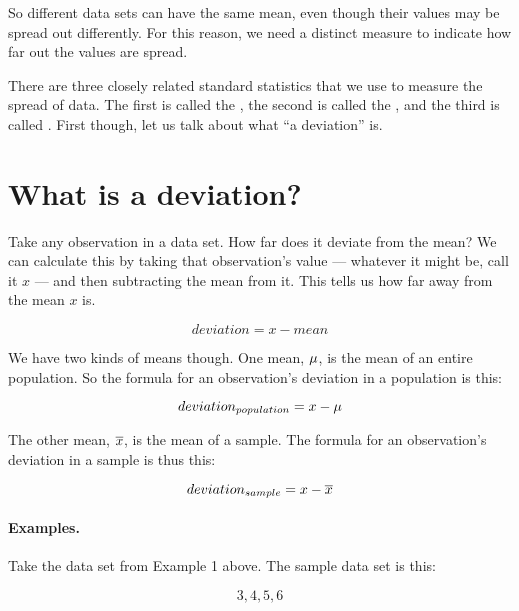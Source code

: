 \documentclass[../../../main.tex]{subfiles}
\begin{document}
So different data sets can have the same mean, even though their values may be spread out differently. For this reason, we need a distinct measure to indicate how far out the values are spread. 

There are three closely related standard statistics that we use to measure the spread of data. The first is called the , the second is called the , and the third is called . First though, let us talk about what ``a deviation'' is.


\section{What is a deviation?}

Take any observation in a data set. How far does it deviate from the mean? We can calculate this by taking that observation's value --- whatever it might be, call it $x$ --- and then subtracting the mean from it. This tells us how far away from the mean $x$ is.

\begin{equation*}
  deviation = x - mean
\end{equation*}

\noindent
We have two kinds of means though. One mean, $\mu{}$, is the mean of an entire population. So the formula for an observation's deviation in a population is this:

\begin{equation*}
  deviation_{population} = x - \mu{}
\end{equation*}

\noindent
The other mean, $\overline{x}$, is the mean of a sample. The formula for an observation's deviation in a sample is thus this:

\begin{equation*}
  deviation_{sample} = x - \overline{x}
\end{equation*}


\paragraph{Examples.}

Take the data set from Example 1 above. The sample data set is this:

\begin{equation*}
  3, 4, 5, 6
\end{equation*}
\end{document}
